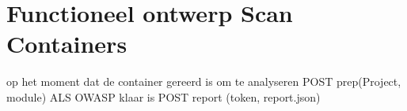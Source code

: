 \chapter{Functioneel ontwerp Scan Containers}\label{ch:impl-scan containers}


op het moment dat de container gereerd is om te analyseren POST prep(Project, module)
ALS OWASP klaar is POST report (token, report.json)
